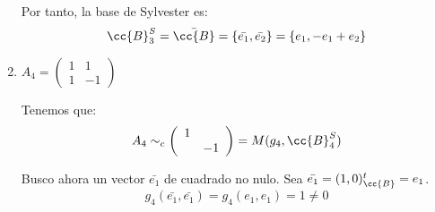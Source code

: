 \begin{ejercicio}
\begin{enumerate}
        Por tanto, la base de Sylvester es:
        \begin{equation*}
            \cc{B}_3^S = \bar{\cc{B}} = \{\bar{e_1},\bar{e_2}\} = \{e_1, -e_1+e_2\}
        \end{equation*}

        \item $A_4=\left(\begin{array}{cc}
            1 & 1 \\
            1 & -1
        \end{array} \right)$
        
        Tenemos que:
        \begin{equation*}
            A_4 \sim_c \left(\begin{array}{cc}
                1 &  \\
                & -1
            \end{array} \right) = M(g_4, \cc{B}_{4}^S)
        \end{equation*}
        
        Busco ahora un vector $\bar{e_1}$ de cuadrado no nulo. Sea $\bar{e_1} = (1,0)^t_{\cc{B}} = e_1$.
        \begin{equation*}
            g_4(\bar{e_1}, \bar{e_1}) =
            g_4(e_1, e_1) = 1 \neq 0
        \end{equation*}


\end{enumerate}
\end{ejercicio}
